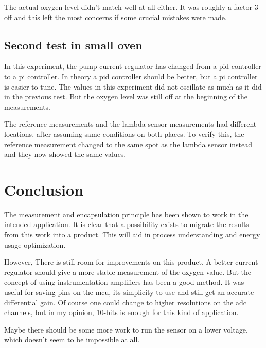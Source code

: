 The actual oxygen level didn't match well at all either. It was roughly a factor 3 off and this left the most concerns if some crucial mistakes were made.


\subsection{Second test in small oven}

In this experiment, the pump current regulator has changed from a \ac{pid} controller to a \ac{pi} controller. In theory a \ac{pid} controller should be better, but a \ac{pi} controller is easier to tune. The values in this experiment did not oscillate as much as it did in the previous test. But the oxygen level was still off at the beginning of the measurements.

The reference measurements and the lambda sensor measurements had different locations, after assuming same conditions on both places. To verify this, the reference measurement changed to the same spot as the lambda sensor instead and they now showed the same values.



\section{Conclusion}

The measurement and encapsulation principle has been shown to work in the intended application. It is clear that a possibility exists to migrate the results from this work into a product. This will aid in process understanding and energy usage optimization.

However, There is still room for improvements on this product. A better current regulator should give a more stable measurement of the oxygen value. But the concept of using instrumentation amplifiers has been a good method. It was useful for saving pins on the \ac{mcu}, its simplicity to use and still get an accurate differential gain. Of course one could change to higher resolutions on the \ac{adc} channels, but in my opinion, 10-bits is enough for this kind of application.


Maybe there should be some more work to run the sensor on a lower voltage, which doesn't seem to be impossible at all. 


